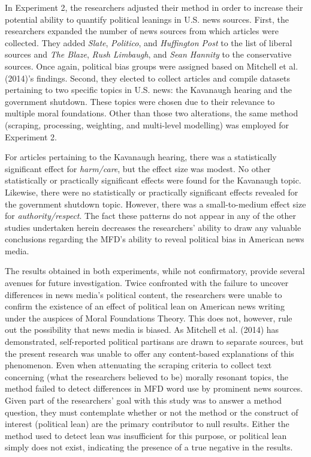 \documentclass[english,,man]{apa6}
\begin{document}
In Experiment 2, the researchers adjusted their method in order to increase their potential ability to quantify political leanings in U.S. news sources. First, the researchers expanded the number of news sources from which articles were collected. They added \emph{Slate}, \emph{Politico}, and \emph{Huffington Post} to the list of liberal sources and \emph{The Blaze}, \emph{Rush Limbaugh}, and \emph{Sean Hannity} to the conservative sources. Once again, political bias groups were assigned based on Mitchell et al. (2014)'s findings. Second, they elected to collect articles and compile datasets pertaining to two specific topics in U.S. news: the Kavanaugh hearing and the government shutdown. These topics were chosen due to their relevance to multiple moral foundations. Other than those two alterations, the same method (scraping, processing, weighting, and multi-level modelling) was employed for Experiment 2.

For articles pertaining to the Kavanaugh hearing, there was a statistically significant effect for \emph{harm/care}, but the effect size was modest. No other statistically or practically significant effects were found for the Kavanaugh topic. Likewise, there were no statistically or practically significant effects revealed for the government shutdown topic. However, there was a small-to-medium effect size for \emph{authority/respect}. The fact these patterns do not appear in any of the other studies undertaken herein decreases the researchers' ability to draw any valuable conclusions regarding the MFD's ability to reveal political bias in American news media.

The results obtained in both experiments, while not confirmatory, provide several avenues for future investigation. Twice confronted with the failure to uncover differences in news media's political content, the researchers were unable to confirm the existence of an effect of political lean on American news writing under the auspices of Moral Foundations Theory. This does not, however, rule out the possibility that news media is biased. As Mitchell et al. (2014) has demonstrated, self-reported political partisans are drawn to separate sources, but the present research was unable to offer any content-based explanations of this phenomenon. Even when attenuating the scraping criteria to collect text concerning (what the researchers believed to be) morally resonant topics, the method failed to detect differences in MFD word use by prominent news sources. Given part of the researchers' goal with this study was to answer a method question, they must contemplate whether or not the method or the construct of interest (political lean) are the primary contributor to null results. Either the method used to detect lean was insufficient for this purpose, or political lean simply does not exist, indicating the presence of a true negative in the results.
\end{document}
